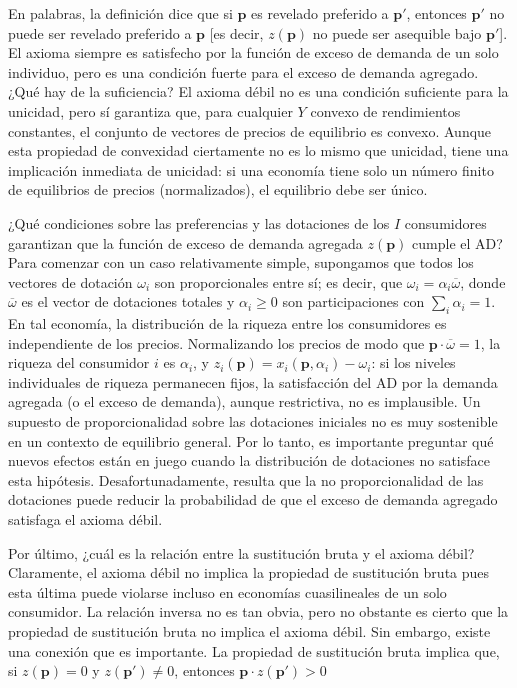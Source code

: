 \documentclass[10pt,a4paper]{article}
\begin{document}
{            En palabras, la definición dice que si $\mathbf p$ es revelado preferido a $\mathbf p'$, entonces $\mathbf p'$ no puede ser revelado preferido a $\mathbf p$ [es decir, $z(\mathbf p)$ no puede ser asequible bajo $\mathbf p'$]. El axioma siempre es satisfecho por la función de exceso de demanda de un solo individuo, pero es una condición fuerte para el exceso de demanda agregado. ¿Qué hay de la suficiencia? El axioma débil no es una condición suficiente para la unicidad, pero sí garantiza que, para cualquier $Y$ convexo de rendimientos constantes, el conjunto de vectores de precios de equilibrio es convexo. Aunque esta propiedad de convexidad ciertamente no es lo mismo que unicidad, tiene una implicación inmediata de unicidad: si una economía tiene solo un número finito de equilibrios de precios (normalizados), el equilibrio debe ser único.
            
            ¿Qué condiciones sobre las preferencias y las dotaciones de los $I$ consumidores garantizan que la función de exceso de demanda agregada $z(\mathbf p)$ cumple el AD? Para comenzar con un caso relativamente simple, supongamos que todos los vectores de dotación $\omega_i$ son proporcionales entre sí; es decir, que $\omega_i=\alpha_i \overline \omega$, donde $\overline\omega$ es el vector de dotaciones totales y $\alpha_i\ge 0$ son participaciones con $\sum_i \alpha_i=1$. En tal economía, la distribución de la riqueza entre los consumidores es independiente de los precios. Normalizando los precios de modo que $\mathbf p\cdot \overline\omega=1$, la riqueza del consumidor $i$ es $\alpha_i$, y $z_i(\mathbf p)=x_i(\mathbf p,\alpha_i)-\omega_i$: si los niveles individuales de riqueza permanecen fijos, la satisfacción del AD por la demanda agregada (o el exceso de demanda), aunque restrictiva, no es implausible. Un supuesto de proporcionalidad sobre las dotaciones iniciales no es muy sostenible en un contexto de equilibrio general. Por lo tanto, es importante preguntar qué nuevos efectos están en juego cuando la distribución de dotaciones no satisface esta hipótesis. Desafortunadamente, resulta que la no proporcionalidad de las dotaciones puede reducir la probabilidad de que el exceso de demanda agregado satisfaga el axioma débil.
            
            Por último, ¿cuál es la relación entre la sustitución bruta y el axioma débil? Claramente, el axioma débil no implica la propiedad de sustitución bruta pues esta última puede violarse incluso en economías cuasilineales de un solo consumidor. La relación inversa no es tan obvia, pero no obstante es cierto que la propiedad de sustitución bruta no implica el axioma débil. Sin embargo, existe una conexión que es importante. La propiedad de sustitución bruta implica que, si $z(\mathbf p)=0$ y $z(\mathbf p')\neq 0$, entonces $\mathbf p\cdot z(\mathbf p')>0$
            } 
\end{document}
